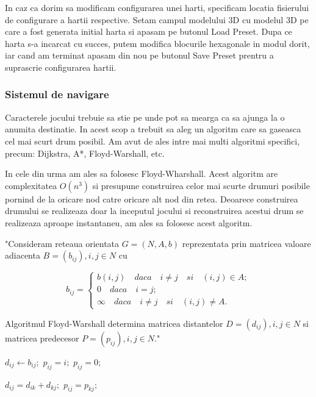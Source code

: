 \documentclass[12pt, a4paper]{article}
\begin{document}
	In caz ca dorim sa modificam configurarea unei harti, specificam locatia fisierului de configurare a hartii respective. Setam campul modelului 3D cu modelul 3D pe care a fost generata initial harta si apasam pe butonul Load Preset. Dupa ce harta s-a incarcat cu succes, putem modifica blocurile hexagonale in modul dorit, iar cand am terminat apasam din nou pe butonul Save Preset prentru a suprascrie configurarea hartii.
	\newline
	
	
	
	
	
	\subsubsection{Sistemul de navigare}
	
	Caracterele jocului trebuie sa stie pe unde pot sa mearga ca sa ajunga la o anumita destinatie. In acest scop a trebuit sa aleg un algoritm care sa gaseasca cel mai scurt drum posibil. Am avut de ales intre mai multi algoritmi specifici, precum: Dijkstra, A*, Floyd-Warshall, etc.
	\newline
	
	In cele din urma am ales sa folosesc Floyd-Wharshall. Acest algoritm are complexitatea $O(n^3)$ si presupune construirea celor mai scurte drumuri posibile pornind de la oricare nod catre oricare alt nod din retea. Deoarece construirea drumului se realizeaza doar la inceputul jocului si reconstruirea acestui drum se realizeaza aproape instantaneu, am ales sa folosesc acest algoritm.
	\newline
	
	"Consideram reteaua orientata $G = (N, A, b)$ reprezentata prin matricea valoare adiacenta $B = (b_{ij}), i, j \in N$ cu
	
	\begin{equation*}
		b_{ij} = \begin{cases}
			b(i, j) \quad daca \quad i \neq j \quad si \quad (i, j) \in A; \\
			0 \quad daca \quad i = j; \\
			\infty \quad daca \quad i \neq j \quad si \quad (i, j) \neq A.
		\end{cases}
	\end{equation*}

	Algoritmul Floyd-Warshall determina matricea distantelor $D = (d_{ij}), i, j \in N$ si matricea predecesor $P = (p_{ij}), i, j \in N$." \cite{grafuriAnul2}
	
	\begin{algorithmic}
					\State $d_{ij} \gets b_{ij};$
						\State $p_{ij} = i;$
					\Else
						\State $p_{ij} = 0;$
					\EndIf
				\EndFor
			\EndFor
			
							\State $d_{ij} = d_{ik} + d_{kj};$
							\State $p_{ij} = p_{kj};$
						\EndIf
					\EndFor
				\EndFor
			\EndFor
		\EndFunction
	\end{algorithmic}
\end{document}
